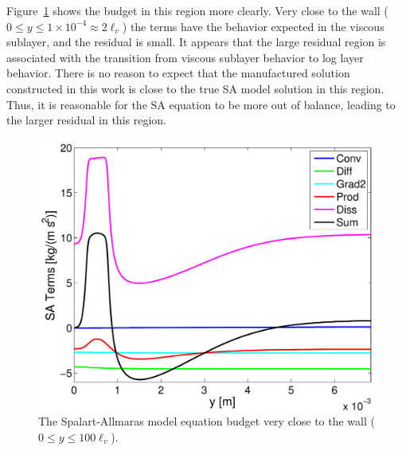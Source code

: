 Figure~\ref{fig:sa_budget_near_wall} shows the budget in this
region more clearly.
Very close to the wall ($0 \leq y \leq 1 \times 10^{-4} \approx 2
\ell_v$) the terms have the behavior expected in the viscous sublayer,
and the residual is small.  It appears that the large residual region
is associated with the transition from viscous sublayer behavior to
log layer behavior.  There is no reason to expect that the
manufactured solution constructed in this work is close to the true SA
model solution in this region.  Thus, it is reasonable for the SA
equation to be more out of balance, leading to the
larger residual in this region.
%
\begin{figure}[htp]
\begin{center}
\includegraphics[width=0.5\linewidth]{figs/sa_budget_near_wall.pdf}
\end{center}
\vspace{-15pt}
\caption{The Spalart-Allmaras model equation budget very close to the wall ($0 \leq y \leq 100 \ell_v$).}\label{fig:sa_budget_near_wall}
\end{figure}
% 